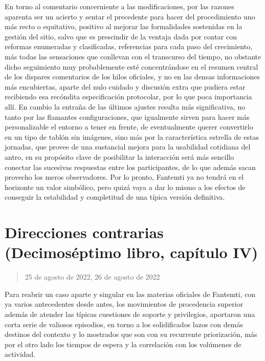 \documentclass[
]{book}
\begin{document}
En torno al comentario concerniente a las modificaciones, por las razones aparenta ser un acierto y sentar el precedente para hacer del procedimiento uno más recto o equitativo, positivo al mejorar las formalidades sostenidas en la gestión del sitio, salvo que es prescindir de la ventaja dada por contar con reformas enumeradas y clasificadas, referencias para cada paso del crecimiento, más todas las sensaciones que conllevan con el transcurso del tiempo, no obstante dicho seguimiento muy probablemente esté concentrándose en el resumen central de los dispares comentarios de los hilos oficiales, y no en las densas informaciones más encubiertas, aparte del nulo cuidado y discusión extra que pudiera estar recibiendo esa recóndita especificación protocolar, por lo que poca importancia allí. En cambio la entraña de las últimos ajustes resulta más significativa, no tanto por las flamantes configuraciones, que igualmente sirven para hacer más personalizable el entorno a tener en frente, de eventualmente querer convertirlo en un tipo de tablón sin imágenes, sino más por la característica estrella de estas jornadas, que provee de una sustancial mejora para la usabilidad cotidiana del antro, en su propósito clave de posibilitar la interacción será más sencillo conectar las sucesivas respuestas entre los participantes, de lo que además sacan provecho los meros observadores. Por lo pronto, Fantemti ya no tendrá en el horizonte un valor simbólico, pero quizá vaya a dar lo mismo a los efectos de conseguir la estabilidad y completitud de una típica versión definitiva.

\hypertarget{direcciones-contrarias-decimosuxe9ptimo-libro-capuxedtulo-iv}{%
\section{Direcciones contrarias (Decimoséptimo libro, capítulo IV)}\label{direcciones-contrarias-decimosuxe9ptimo-libro-capuxedtulo-iv}}

\begin{quote}
25 de agosto de 2022, 26 de agosto de 2022
\end{quote}

Para reabrir un caso aparte y singular en las materias oficiales de Fantemti, con ya varios antecedentes desde antes, los movimientos de procedencia superior además de atender las típicas cuestiones de soporte y privilegios, aportaron una corta serie de valiosos episodios, en torno a los solidificados lazos con demás destinos del contexto y lo mostrados que son con su recurrente priorización, más por el otro lado los tiempos de espera y la correlación con los volúmenes de actividad.
\end{document}
